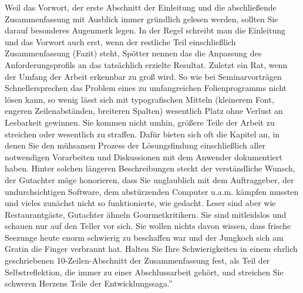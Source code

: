 Weil das Vorwort, der erste Abschnitt der Einleitung und die abschließende Zusammenfassung mit Ausblick immer gründlich gelesen werden, sollten Sie darauf besonderes Augenmerk
legen. In der Regel schreibt man die Einleitung und das Vorwort auch erst, wenn der restliche
Teil einschließlich Zusammenfassung (Fazit) steht, Spötter nennen das die Anpassung des
Anforderungsprofils an das tatsächlich erzielte Resultat.
Zuletzt ein Rat, wenn der Umfang der Arbeit erkennbar zu groß wird. So wie bei Seminarvorträgen Schnellersprechen das Problem eines zu umfangreichen Folienprogramms nicht
lösen kann, so wenig lässt sich mit typografischen Mitteln (kleinerem Font, engeren Zeilenabständen, breiteren Spalten) wesentlich Platz ohne Verlust an Lesbarkeit gewinnen. Sie kommen
nicht umhin, größere Teile der Arbeit zu streichen oder wesentlich zu straffen.
Dafür bieten sich oft die Kapitel an, in denen Sie den mühsamen Prozess der Lösungsfindung
einschließlich aller notwendigen Vorarbeiten und Diskussionen mit dem Anwender dokumentiert haben. Hinter solchen längeren Beschreibungen steckt der verständliche Wunsch, der Gutachter möge honorieren, dass Sie unglaublich mit dem Auftraggeber, der undurchsichtigen
Software, dem abstürzenden Computer u.a.m. kämpfen mussten und vieles zunächst nicht so
funktionierte, wie gedacht.
Leser sind aber wie Restaurantgäste, Gutachter ähneln Gourmetkritikern. Sie sind mitleidslos und schauen nur auf den Teller vor sich. Sie wollen nichts davon wissen, dass frische Seezunge heute enorm schwierig zu beschaffen war und der Jungkoch sich am Gratin die Finger
verbrannt hat. Halten Sie Ihre Schwierigkeiten in einem ehrlich geschriebenen 10-Zeilen-Abschnitt der Zusammenfassung fest, als Teil der Selbstreflektion, die immer zu einer
Abschlussarbeit gehört, und streichen Sie schweren Herzens Teile der Entwicklungssaga.''
